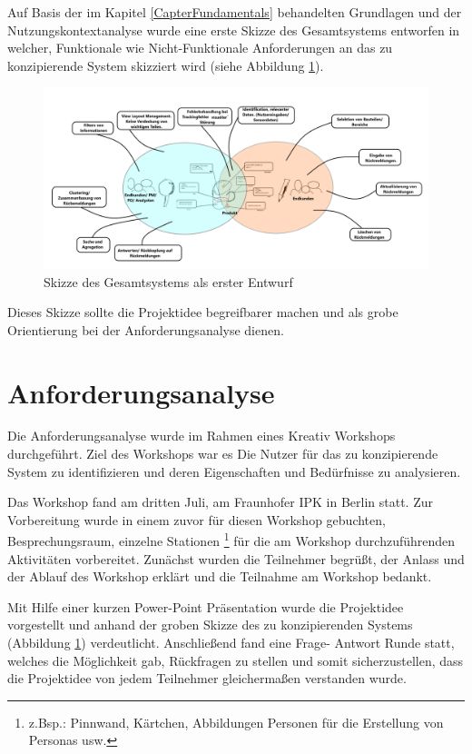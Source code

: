 Auf Basis der im Kapitel \ref{CapterFundamentals} behandelten Grundlagen und der Nutzungskontextanalyse wurde eine erste Skizze des Gesamtsystems entworfen in welcher, 
Funktionale wie Nicht-Funktionale Anforderungen an das zu konzipierende System skizziert wird (siehe Abbildung \ref{img:sysstem_sketch}).

\begin{figure}[H]
	\centering
	\includegraphics[width=1.0\textwidth]{resources/conception/skizze_gesamtsystem.png}
	\caption{Skizze des Gesamtsystems als erster Entwurf \cite{system sketch}}
	\label{img:sysstem_sketch}
\end{figure}

Dieses Skizze sollte die Projektidee begreifbarer machen und als grobe Orientierung bei der Anforderungsanalyse dienen.

\section{Anforderungsanalyse}

Die Anforderungsanalyse wurde im Rahmen eines Kreativ Workshops durchgeführt. Ziel des Workshops war es Die Nutzer für das zu konzipierende System zu identifizieren und deren Eigenschaften und Bedürfnisse 
zu analysieren. 

Das Workshop fand am dritten Juli, am Fraunhofer IPK in Berlin statt. Zur Vorbereitung wurde in einem zuvor für diesen Workshop gebuchten, Besprechungsraum, einzelne Stationen \footnote{z.Bsp.: Pinnwand, Kärtchen, Abbildungen Personen für die Erstellung von Personas usw.} für die am Workshop durchzuführenden Aktivitäten vorbereitet. 
Zunächst wurden die Teilnehmer begrüßt, der Anlass und der Ablauf des Workshop erklärt und die Teilnahme am Workshop bedankt. 

Mit Hilfe einer kurzen Power-Point Präsentation wurde die Projektidee vorgestellt und anhand der groben Skizze des zu konzipierenden Systems (Abbildung \ref{img:sysstem_sketch}) verdeutlicht. 
Anschließend fand eine Frage- Antwort Runde statt, welches die Möglichkeit gab, Rückfragen zu stellen und somit sicherzustellen, dass die Projektidee von jedem Teilnehmer gleichermaßen verstanden wurde. 

